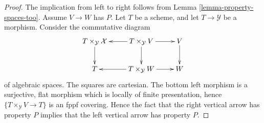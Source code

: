 \documentclass[10pt,a4paper]{amsart}
\theoremstyle{plain}
\theoremstyle{definition}
\theoremstyle{remark}
\numberwithin{equation}{subsection}
\begin{document}
\begin{proof}
The implication from left to right follows from
Lemma \ref{lemma-property-spaces-too}.
Assume $V \to W$ has $P$. Let $T$ be a scheme, and let
$T \to \mathcal{Y}$ be a morphism. Consider the commutative diagram
$$
\xymatrix{
T \times_\mathcal{Y} \mathcal{X} \ar[d] &
T \times_\mathcal{Y} V \ar[d] \ar[l] \ar[r] &
V \ar[d] \\
T & T \times_\mathcal{Y} W \ar[l] \ar[r] & W
}
$$
of algebraic spaces. The squares are cartesian.
The bottom left morphism is a surjective, flat morphism which is locally of
finite presentation, hence $\{T \times_\mathcal{Y} V \to T\}$ is an
fppf covering. Hence the fact that the right vertical arrow has property
$P$ implies that the left vertical arrow has property $P$.
\end{proof}
\end{document}
